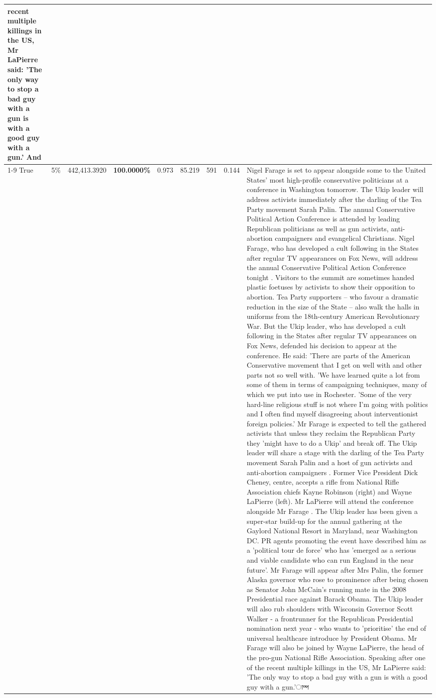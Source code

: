\begin{table}[H]
\begin{tabular}{lllrlllll}
recent multiple killings in the US, Mr LaPierre said: 'The only way to stop a bad guy with a gun is with a good guy with a gun.' And \\
\cline{1-9} \cline{2-9}
True & 5\% & 442,413.3920 & \bfseries \color{red} 100.0000\% & 0.973 & 85.219 & 591 & 0.144 & Nigel Farage is set to appear alongside some to the United States' most high-profile conservative politicians at a conference in Washington tomorrow. The Ukip leader will address activists immediately after the darling of the Tea Party movement Sarah Palin. The annual Conservative Political Action Conference is attended by leading Republican politicians as well as gun activists, anti-abortion campaigners and evangelical Christians. Nigel Farage, who has developed a cult following in the States after regular TV appearances on Fox News, will address the annual Conservative Political Action Conference tonight . Visitors to the summit are sometimes handed plastic foetuses by activists to show their opposition to abortion. Tea Party supporters – who favour a dramatic reduction in the size of the State – also walk the halls in uniforms from the 18th-century American Revolutionary War. But the Ukip leader, who has developed a cult following in the States after regular TV appearances on Fox News, defended his decision to appear at the conference. He said: 'There are parts of the American Conservative movement that I get on well with and other parts not so well with. 'We have learned quite a lot from some of them in terms of campaigning techniques, many of which we put into use in Rochester. 'Some of the very hard-line religious stuff is not where I'm going with politics and I often find myself disagreeing about interventionist foreign policies.' Mr Farage is expected to tell the gathered activists that unless they reclaim the Republican Party they 'might have to do a Ukip' and break off. The Ukip leader will share a stage with the darling of the Tea Party movement Sarah Palin and a host of gun activists and anti-abortion campaigners . Former Vice President Dick Cheney, centre, accepts a rifle from National Rifle Association chiefs Kayne Robinson (right) and Wayne LaPierre (left). Mr LaPierre will attend the conference alongside Mr Farage . The Ukip leader has been given a super-star build-up for the annual gathering at the Gaylord National Resort in Maryland, near Washington DC. PR agents promoting the event have described him as a 'political tour de force' who has 'emerged as a serious and viable candidate who can run England in the near future'. Mr Farage will appear after Mrs Palin, the former Alaska governor who rose to prominence after being chosen as Senator John McCain's running mate in the 2008 Presidential race against Barack Obama. The Ukip leader will also rub shoulders with Wisconsin Governor Scott Walker - a frontrunner for the Republican Presidential nomination next year - who wants to 'prioritise' the end of universal healthcare introduce by President Obama. Mr Farage will also be joined by Wayne LaPierre, the head of the pro-gun National Rifle Association. Speaking after one of the recent multiple killings in the US, Mr LaPierre said: 'The only way to stop a bad guy with a gun is with a good guy with a gun.'াম্প \\

\end{tabular}
\end{table}
